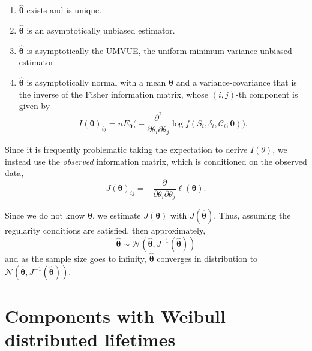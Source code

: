 \documentclass[
]{article}
\begin{document}
\begin{enumerate}
\def\labelenumi{\arabic{enumi}.}
\item
  \(\boldsymbol{\hat\theta}\) exists and is unique.
\item
  \(\boldsymbol{\hat\theta}\) is an asymptotically unbiased estimator.
\item
  \(\boldsymbol{\hat\theta}\) is asymptotically the UMVUE, the uniform
  minimum variance unbiased estimator.
\item
  \(\boldsymbol{\hat\theta}\) is asymptotically normal with a mean
  \(\boldsymbol{\theta}\) and a variance-covariance that is the inverse
  of the Fisher information matrix, whose \((i,j)\)-th component is
  given by \[
   I(\boldsymbol{\theta})_{i j} = n E_{\boldsymbol{\theta}}\biggl(-\frac{\partial^2}{\partial \theta_i \partial \theta_j}
       \log f(S_i,\delta_i,\mathcal{C}_i;\boldsymbol{\theta})\biggr).
  \]
\end{enumerate}

Since it is frequently problematic taking the expectation to derive
\(I(\theta)\), we instead use the \emph{observed} information matrix,
which is conditioned on the observed data, \[
J(\boldsymbol{\theta})_{i j} = -\frac{\partial}{\partial \theta_i \partial \theta_j}
    \ell(\boldsymbol{\theta}).
\]

Since we do not know \(\boldsymbol{\theta}\), we estimate
\(J(\boldsymbol{\theta})\) with \(J(\boldsymbol{\hat\theta})\). Thus,
assuming the regularity conditions are satisfied, then approximately, \[
    \hat{\boldsymbol{\theta}} \sim \mathcal{N}(\hat{\boldsymbol{\theta}},J^{-1}(\hat{\boldsymbol{\theta}}))
\] and as the sample size goes to infinity,
\(\hat{\boldsymbol{\theta}}\) converges in distribution to
\(\mathcal{N}(\hat{\boldsymbol{\theta}},J^{-1}(\hat{\boldsymbol{\theta}}))\).

\hypertarget{sec:weibull}{%
\section{Components with Weibull distributed
lifetimes}\label{sec:weibull}}
\end{document}
